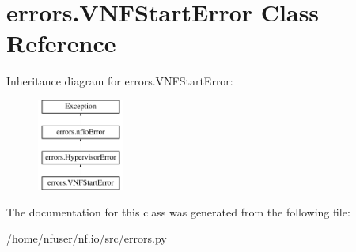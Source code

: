 \hypertarget{classerrors_1_1VNFStartError}{\section{errors.\-V\-N\-F\-Start\-Error Class Reference}
\label{classerrors_1_1VNFStartError}
}
Inheritance diagram for errors.\-V\-N\-F\-Start\-Error\-:\begin{figure}[H]
\begin{center}
\leavevmode
\includegraphics[height=3.000000cm]{classerrors_1_1VNFStartError}
\end{center}
\end{figure}


The documentation for this class was generated from the following file\-:\begin{DoxyCompactItemize}
\item 
/home/nfuser/nf.\-io/src/errors.\-py\end{DoxyCompactItemize}
